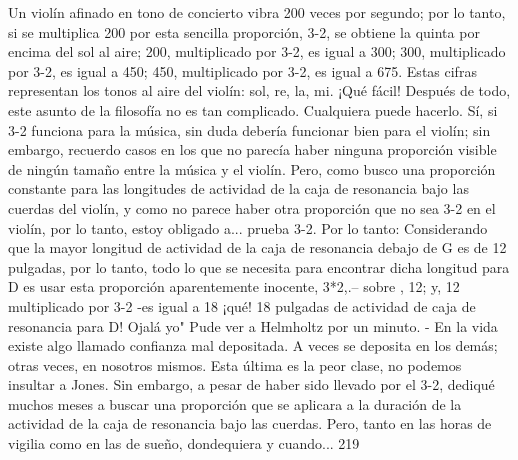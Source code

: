 Un violín afinado en tono de concierto vibra 200 veces por segundo; por lo tanto, si se multiplica 200 por esta sencilla proporción, 3-2, se obtiene la quinta por encima del sol al aire; 200, multiplicado por 3-2, es igual a 300; 300, multiplicado por 3-2, es igual a 450; 450, multiplicado por 3-2, es igual a 675. Estas cifras representan los tonos al aire del violín: sol, re, la, mi. ¡Qué fácil! Después de todo, este asunto de la filosofía no es tan complicado. Cualquiera puede hacerlo. Sí, si 3-2 funciona para la música, sin duda debería funcionar bien para el violín; sin embargo, recuerdo casos en los que no parecía haber ninguna proporción visible de ningún tamaño entre la música y el violín. Pero, como busco una proporción constante para las longitudes de actividad de la caja de resonancia bajo las cuerdas del violín, y como no parece haber otra proporción que no sea 3-2 en el violín, por lo tanto, estoy obligado a...
prueba 3-2.
Por lo tanto: Considerando que la mayor longitud de actividad de la caja de resonancia debajo de G es de 12 pulgadas, por lo tanto, todo lo que se necesita para encontrar dicha longitud para D es usar esta proporción aparentemente inocente, 3*2,.-- sobre , 12;
y, 12 multiplicado por 3-2 -es igual a 18 ¡qué!	18
pulgadas de actividad de caja de resonancia para D! Ojalá yo"	
Pude ver a Helmholtz por un minuto.	-
En la vida existe algo llamado confianza mal depositada. A veces se deposita en los demás; otras veces, en nosotros mismos. Esta última es la peor clase, no podemos insultar a Jones.
Sin embargo, a pesar de haber sido llevado por el 3-2, dediqué muchos meses a buscar una proporción que se aplicara a la duración de la actividad de la caja de resonancia bajo las cuerdas. Pero, tanto en las horas de vigilia como en las de sueño, dondequiera y cuando...
219

